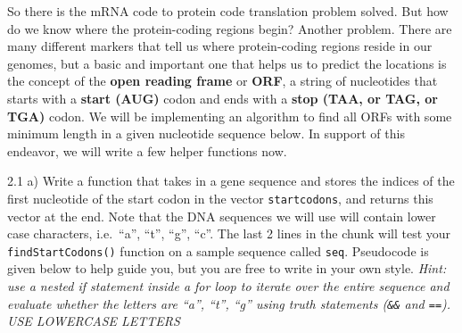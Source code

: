 \documentclass[
]{article}
\begin{document}
So there is the mRNA code to protein code translation problem solved.
But how do we know where the protein-coding regions begin? Another
problem. There are many different markers that tell us where
protein-coding regions reside in our genomes, but a basic and important
one that helps us to predict the locations is the concept of the
\textbf{open reading frame} or \textbf{ORF}, a string of nucleotides
that starts with a \textbf{start (AUG)} codon and ends with a
\textbf{stop (TAA, or TAG, or TGA)} codon. We will be implementing an
algorithm to find all ORFs with some minimum length in a given
nucleotide sequence below. In support of this endeavor, we will write a
few helper functions now.

2.1 a) Write a function that takes in a gene sequence and stores the
indices of the first nucleotide of the start codon in the vector
\texttt{startcodons}, and returns this vector at the end. Note that the
DNA sequences we will use will contain lower case characters,
i.e.~``a'', ``t'', ``g'', ``c''. The last 2 lines in the chunk will test
your \texttt{findStartCodons()} function on a sample sequence called
\texttt{seq}. Pseudocode is given below to help guide you, but you are
free to write in your own style. \emph{Hint: use a nested if statement
inside a for loop to iterate over the entire sequence and evaluate
whether the letters are ``a'', ``t'', ``g'' using truth statements
(\texttt{\&\&} and \texttt{==}). USE LOWERCASE LETTERS} \span
\end{document}
